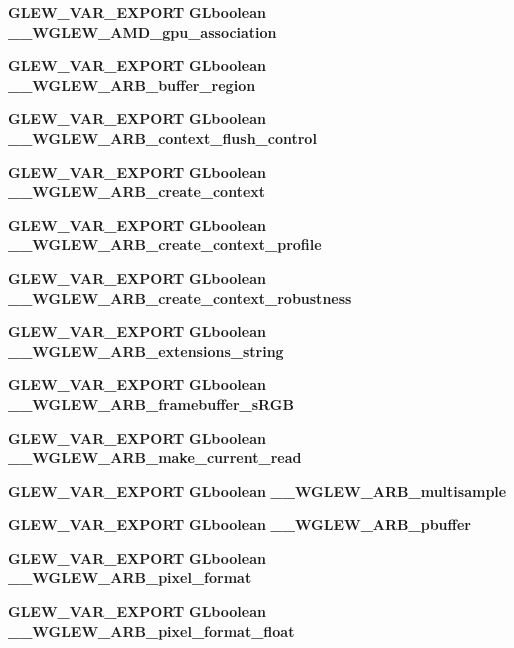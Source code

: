 \begin{DoxyCompactItemize}
\item 
{\bf G\+L\+E\+W\+\_\+\+V\+A\+R\+\_\+\+E\+X\+P\+O\+RT} {\bf G\+Lboolean} {\bf \+\_\+\+\_\+\+W\+G\+L\+E\+W\+\_\+\+A\+M\+D\+\_\+gpu\+\_\+association}
\item 
{\bf G\+L\+E\+W\+\_\+\+V\+A\+R\+\_\+\+E\+X\+P\+O\+RT} {\bf G\+Lboolean} {\bf \+\_\+\+\_\+\+W\+G\+L\+E\+W\+\_\+\+A\+R\+B\+\_\+buffer\+\_\+region}
\item 
{\bf G\+L\+E\+W\+\_\+\+V\+A\+R\+\_\+\+E\+X\+P\+O\+RT} {\bf G\+Lboolean} {\bf \+\_\+\+\_\+\+W\+G\+L\+E\+W\+\_\+\+A\+R\+B\+\_\+context\+\_\+flush\+\_\+control}
\item 
{\bf G\+L\+E\+W\+\_\+\+V\+A\+R\+\_\+\+E\+X\+P\+O\+RT} {\bf G\+Lboolean} {\bf \+\_\+\+\_\+\+W\+G\+L\+E\+W\+\_\+\+A\+R\+B\+\_\+create\+\_\+context}
\item 
{\bf G\+L\+E\+W\+\_\+\+V\+A\+R\+\_\+\+E\+X\+P\+O\+RT} {\bf G\+Lboolean} {\bf \+\_\+\+\_\+\+W\+G\+L\+E\+W\+\_\+\+A\+R\+B\+\_\+create\+\_\+context\+\_\+profile}
\item 
{\bf G\+L\+E\+W\+\_\+\+V\+A\+R\+\_\+\+E\+X\+P\+O\+RT} {\bf G\+Lboolean} {\bf \+\_\+\+\_\+\+W\+G\+L\+E\+W\+\_\+\+A\+R\+B\+\_\+create\+\_\+context\+\_\+robustness}
\item 
{\bf G\+L\+E\+W\+\_\+\+V\+A\+R\+\_\+\+E\+X\+P\+O\+RT} {\bf G\+Lboolean} {\bf \+\_\+\+\_\+\+W\+G\+L\+E\+W\+\_\+\+A\+R\+B\+\_\+extensions\+\_\+string}
\item 
{\bf G\+L\+E\+W\+\_\+\+V\+A\+R\+\_\+\+E\+X\+P\+O\+RT} {\bf G\+Lboolean} {\bf \+\_\+\+\_\+\+W\+G\+L\+E\+W\+\_\+\+A\+R\+B\+\_\+framebuffer\+\_\+s\+R\+GB}
\item 
{\bf G\+L\+E\+W\+\_\+\+V\+A\+R\+\_\+\+E\+X\+P\+O\+RT} {\bf G\+Lboolean} {\bf \+\_\+\+\_\+\+W\+G\+L\+E\+W\+\_\+\+A\+R\+B\+\_\+make\+\_\+current\+\_\+read}
\item 
{\bf G\+L\+E\+W\+\_\+\+V\+A\+R\+\_\+\+E\+X\+P\+O\+RT} {\bf G\+Lboolean} {\bf \+\_\+\+\_\+\+W\+G\+L\+E\+W\+\_\+\+A\+R\+B\+\_\+multisample}
\item 
{\bf G\+L\+E\+W\+\_\+\+V\+A\+R\+\_\+\+E\+X\+P\+O\+RT} {\bf G\+Lboolean} {\bf \+\_\+\+\_\+\+W\+G\+L\+E\+W\+\_\+\+A\+R\+B\+\_\+pbuffer}
\item 
{\bf G\+L\+E\+W\+\_\+\+V\+A\+R\+\_\+\+E\+X\+P\+O\+RT} {\bf G\+Lboolean} {\bf \+\_\+\+\_\+\+W\+G\+L\+E\+W\+\_\+\+A\+R\+B\+\_\+pixel\+\_\+format}
\item 
{\bf G\+L\+E\+W\+\_\+\+V\+A\+R\+\_\+\+E\+X\+P\+O\+RT} {\bf G\+Lboolean} {\bf \+\_\+\+\_\+\+W\+G\+L\+E\+W\+\_\+\+A\+R\+B\+\_\+pixel\+\_\+format\+\_\+float}
\item 

\end{DoxyCompactItemize}
